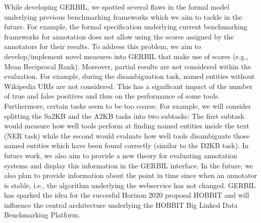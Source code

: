While developing GERBIL, we spotted several flaws in the formal model underlying previous benchmarking frameworks which we aim to tackle in the future. 
For example, the formal specification underlying current benchmarking frameworks for annotation does not allow using the scores assigned by the annotators for their results. To address this problem, we aim to develop/implement novel measures into GERBIL that make use of scores (e.g., Mean Reciprocal Rank). 
Moreover, partial results are not considered within the evaluation. For example, during the disambiguation task, named entities without Wikipedia URIs are not considered. This has a significant impact of the number of true and false positives and thus on the performance of some tools.
Furthermore, certain tasks seem to be too coarse. For example, we will consider splitting the Sa2KB and the A2KB tasks into two subtasks: The first subtask would measure how well tools perform at finding named entities inside the text (NER task) while the second would evaluate how well tools disambiguate those named entities which have been found correctly (similar to the D2KB task).
In future work, we also aim to provide a new theory for evaluating annotation systems and display this information in the GERBIL interface.
In the future, we also plan to provide information about the point in time since when an annotator is stable, i.e., the algorithm underlying the webservice has not changed.
GERBIL has sparked the idea for the succesful Horizon 2020 proposal HOBBIT and will influence the central architecture underlying the HOBBIT Big Linked Data Benchmarking Platform. 
